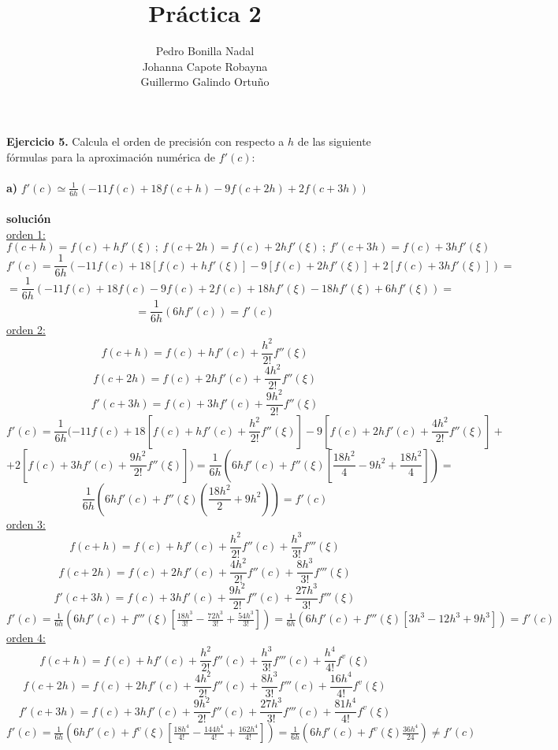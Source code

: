 \documentclass[11pt]{article}
\title{\textbf{Práctica 2}}
\author{Pedro Bonilla Nadal\\
		Johanna Capote Robayna\\
		Guillermo Galindo Ortuño}
\date{}
\begin{document}
\maketitle

\textbf{Ejercicio 5.} Calcula el orden de precisión con respecto a $h$ de las siguiente fórmulas para la aproximación numérica de $f'(c)$: \\ \\

\textbf{a)} $f'(c) \simeq \frac{1}{6h}(-11f(c) + 18f(c + h) -9f(c + 2h) +2f(c+3h))$ \\ \\
\textbf{solución} \\
\underline{orden 1:} \\
$$f(c + h) = f(c) + hf'(\xi) \ ; \ f(c + 2h) = f(c) + 2hf'(\xi) \ ; \ f'(c + 3h) = f(c) + 3hf'(\xi)$$
$$f'(c) = \frac{1}{6h}(-11f(c) + 18  [f(c) + hf'(\xi)] - 9  [f(c) + 2hf'(\xi)] + 2 [f(c) + 3hf'(\xi)]) = $$
$$= \frac{1}{6h}(-11f(c) + 18f(c) - 9f(c) + 2f(c) + 18hf'(\xi) - 18hf'(\xi) + 6hf'(\xi)) = $$
$$= \frac{1}{6h}(6hf'(c)) = f'(c) $$
\underline{orden 2:} \\
$$ f(c + h) = f(c) + hf'(c) + \frac{h^{2}}{2!} f''(\xi)$$ $$ f(c + 2h) = f(c) + 2hf'(c) + \frac{4h^{2}}{2!} f''(\xi)$$ $$f'(c + 3h) = f(c) + 3hf'(c) + \frac{9h^{2}}{2!} f''(\xi) $$
$$f'(c) = \frac{1}{6h}(-11f(c) + 18  [f(c) + hf'(c) + \frac{h^{2}}{2!} f''(\xi)] - 9  [f(c) + 2hf'(c) + \frac{4h^{2}}{2!} f''(\xi)] +$$ $$ + 2 [f(c) + 3hf'(c) + \frac{9h^{2}}{2!} f''(\xi)]) = \frac{1}{6h}(6hf'(c) + f''(\xi)[\frac{18h^{2}}{4} - 9h^{2} + \frac{18h^{2}}{4}]) = $$ $$\frac{1}{6h}(6hf'(c) + f''(\xi)(\frac{18h^{2}}{2} + 9h^{2})) = f'(c)$$
\underline{orden 3:} \\
$$ f(c + h) = f(c) + hf'(c) + \frac{h^{2}}{2!} f''(c) + \frac{h^{3}}{3!}f'''(\xi)$$
$$ f(c + 2h) = f(c) + 2hf'(c) + \frac{4h^{2}}{2!} f''(c) + \frac{8h^{3}}{3!}f'''(\xi)$$ 
$$f'(c + 3h) = f(c) + 3hf'(c) + \frac{9h^{2}}{2!} f''(c) + \frac{27h^{3}}{3!}f'''(\xi)$$
$f'(c) = \frac{1}{6h}(6hf'(c) + f'''(\xi)[\frac{18h^{3}}{3!} - \frac{72h^{3}}{3!} + \frac{54h^{3}}{3!}]) =  \frac{1}{6h}(6hf'(c) + f'''(\xi)[3h^{3} - 12h^{3} + 9h^{3}]) = f'(c)  $ \\
\underline{orden 4:} \\
$$ f(c + h) = f(c) + hf'(c) + \frac{h^{2}}{2!} f''(c) + \frac{h^{3}}{3!}f'''(c) + \frac{h^{4}}{4!}f^{v}(\xi)$$
$$ f(c + 2h) = f(c) + 2hf'(c) + \frac{4h^{2}}{2!} f''(c) + \frac{8h^{3}}{3!}f'''(c) + \frac{16h^{4}}{4!}f^{v}(\xi)$$ 
$$f'(c + 3h) = f(c) + 3hf'(c) + \frac{9h^{2}}{2!} f''(c) + \frac{27h^{3}}{3!}f'''(c) + \frac{81h^{4}}{4!}f^{v}(\xi)$$
$f'(c) = \frac{1}{6h}(6hf'(c) + f^{v}(\xi)[\frac{18h^{4}}{4!} - \frac{144h^{4}}{4!} + \frac{162h^{4}}{4!}]) = \frac{1}{6h}(6hf'(c) + f^{v}(\xi)\frac{36h^{4}}{24}) \neq f'(c) $ \\
\end{document}
